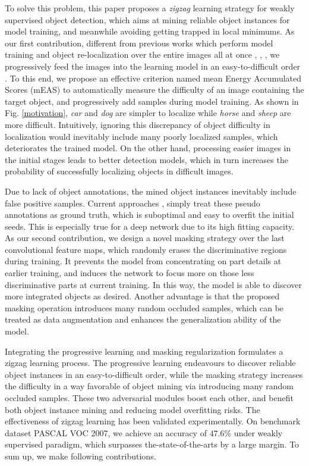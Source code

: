 \documentclass[10pt,twocolumn,letterpaper]{article}
\begin{document}
To solve this problem, this paper proposes a \emph{zigzag} learning strategy for weakly supervised object detection, which aims at mining reliable object instances for model training, and meanwhile avoiding getting trapped in local minimums. As our first contribution, different from previous works which perform model training and object re-localization over the entire images all at once \cite{Li_2016_CVPR}, \cite{Tang_2017_CVPR}, \cite{jie2017deep}, we progressively feed the images into the learning model in an easy-to-difficult order \cite{kumar2010self}. To this end, we propose an effective criterion named mean Energy Accumulated Scores (mEAS) to automatically measure the difficulty of an image containing the target object, and progressively add samples during model training. As shown in Fig. \ref{motivation}, \textit{car} and \textit{dog} are simpler to localize while \textit{horse} and \textit{sheep} are more difficult. Intuitively, ignoring this discrepancy of object difficulty in localization would inevitably include many poorly localized samples, which deteriorates the trained model. On the other hand, processing easier images in the initial stages leads to better detection models, which in turn increases the probability of successfully localizing objects in difficult images.


Due to lack of object annotations, the mined object instances inevitably include false positive samples. Current approaches \cite{Li_2016_CVPR}, \cite{Tang_2017_CVPR} simply treat these pseudo annotations as ground truth, which is suboptimal and easy to overfit the initial seeds. This is especially true for a deep network due to its high fitting capacity. As our second contribution, we design a novel masking strategy over the last convolutional feature maps, which randomly erases the discriminative regions during training. It prevents the model from concentrating on part details at earlier training, and induces the network to focus more on those less discriminative parts at current  training. In this way, the model is able to discover more integrated objects as desired. Another advantage is that the proposed masking operation introduces many random occluded samples, which can be treated as data augmentation and enhances the generalization ability of the model.






Integrating the progressive learning and masking regularization formulates a zigzag learning process. The progressive learning endeavours to discover reliable object instances in an easy-to-difficult order, while the masking strategy increases the difficulty in a way favorable of object mining via introducing many random occluded samples. These two adversarial modules boost each other, and benefit both object instance mining and reducing model overfitting risks. The effectiveness of zigzag learning has been validated experimentally. On benchmark dataset PASCAL VOC 2007, we achieve an accuracy of $47.6\%$ under weakly supervised paradigm, which surpasses the-state-of-the-arts by a large margin.
To sum up, we make following contributions.
\end{document}
